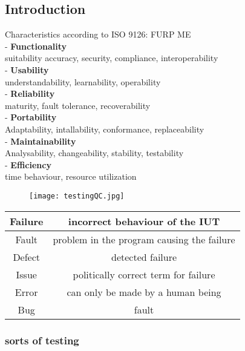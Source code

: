 \subsection{Introduction}
Characteristics according to ISO 9126: FURP ME\\
- \textbf{Functionality}\\
 suitability accuracy, security, compliance, interoperability\\
- \textbf{Usability}\\
 understandability, learnability, operability\\
- \textbf{Reliability}\\
 maturity, fault tolerance, recoverability\\
- \textbf{Portability}\\
 Adaptability, intallability, conformance, replaceability\\
- \textbf{Maintainability}\\
 Analysability, changeability, stability, testability\\
- \textbf{Efficiency}\\
 time behaviour, resource utilization\\
 

\begin{figure}[h!]
\centering
\texttt{[image: testingQC.jpg]}
\caption{}
\label{fig:testingQC}
\end{figure}

\begin{tabular}{c|c}
	Failure  & incorrect behaviour of the IUT \\ 
	\hline Fault  & problem in the program causing the failure \\ 
	\hline Defect & detected failure \\ 
	\hline Issue & politically correct term for failure \\ 
	\hline Error & can only be made by a human being  \\ 
	\hline Bug & fault \\ 	
\end{tabular} 

\subsubsection{sorts of testing}

